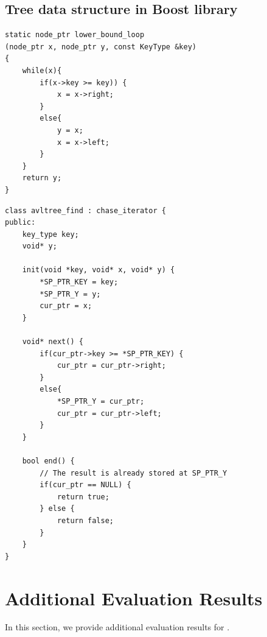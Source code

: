 \begin{minipage}{0.47\textwidth}
\subsection{Tree data structure in Boost library}
\centering
\begin{lstlisting}[caption={Boost realization for \code{avltree::find()}},label={lst:avltree}, captionpos=t]
static node_ptr lower_bound_loop
(node_ptr x, node_ptr y, const KeyType &key)
{
    while(x){
        if(x->key >= key)) {
            x = x->right;
        }
        else{
            y = x;
            x = x->left;
        }
    }
    return y;
}
\end{lstlisting}

\begin{lstlisting}[caption={\pulse realization for \code{avltree::find()}},label={lst:avltree_mod}, captionpos=t]
class avltree_find : chase_iterator {
public:
    key_type key;
    void* y;
  
    init(void *key, void* x, void* y) {
        *SP_PTR_KEY = key;
        *SP_PTR_Y = y;
        cur_ptr = x;
    }
  
    void* next() {
        if(cur_ptr->key >= *SP_PTR_KEY) {
            cur_ptr = cur_ptr->right;
        }
        else{
            *SP_PTR_Y = cur_ptr;
            cur_ptr = cur_ptr->left;
        }
    }
  
    bool end() {
        // The result is already stored at SP_PTR_Y
        if(cur_ptr == NULL) {
            return true;
        } else {
            return false;
        }
    }
}
\end{lstlisting}
\end{minipage}

\section{\pulse Additional Evaluation Results}
\label{sec:appendix}

In this section, we provide additional evaluation results for \pulse.




